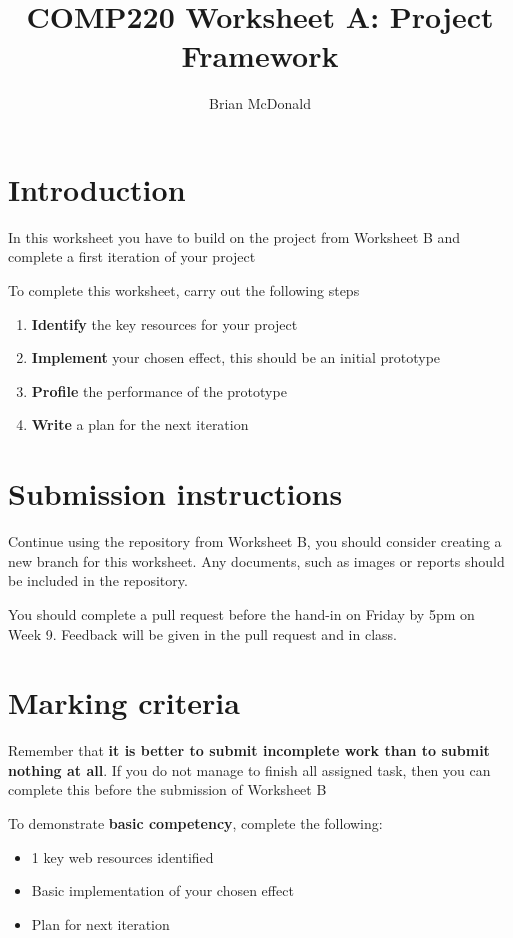 \documentclass{../../../fal_assignment}
\title{COMP220 Worksheet A: Project Framework}
\author{Brian McDonald}
\begin{document}
\maketitle

\section*{Introduction}

In this worksheet you have to build on the project from Worksheet B and complete a first iteration of your project

To complete this worksheet, carry out the following steps
\begin{enumerate}[label=(\alph*)]
	\item \textbf{Identify} the key resources for your project
	\item \textbf{Implement} your chosen effect, this should be an initial prototype
	\item \textbf{Profile} the performance of the prototype
	\item \textbf{Write} a plan for the next iteration
\end{enumerate}

\section*{Submission instructions}

Continue using the repository from Worksheet B, you should consider creating a new branch for this worksheet. Any documents, such as images or reports should be included in the repository.

You should complete a pull request before the hand-in on Friday by 5pm on Week 9. Feedback will be given in the pull request and in class.

\section*{Marking criteria}

Remember that \textbf{it is better to submit incomplete work than to submit nothing at all}. If you do not manage to finish all assigned task, then you can complete this before the submission of Worksheet B

To demonstrate \textbf{basic competency}, complete the following:
\begin{itemize}
	\item 1 key web resources identified
	\item Basic implementation of your chosen effect
	\item Plan for next iteration
\end{itemize} 
\end{document}
